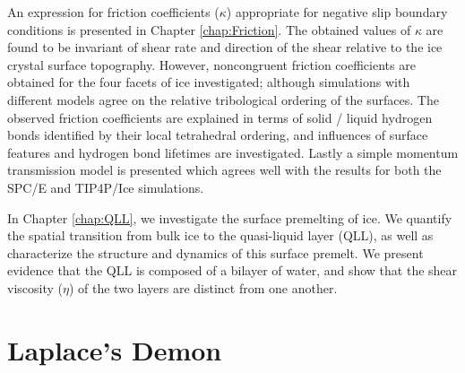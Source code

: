 An expression for friction coefficients ($\kappa$) appropriate for
negative slip boundary conditions is presented in Chapter
\ref{chap:Friction}. The obtained values of $\kappa$ are found to be
invariant of shear rate and direction of the shear relative to the ice
crystal surface topography. However, noncongruent friction
coefficients are obtained for the four facets of ice investigated;
although simulations with different models agree on the relative
tribological ordering of the surfaces. The observed friction
coefficients are explained in terms of solid / liquid hydrogen bonds
identified by their local tetrahedral ordering, and influences of
surface features and hydrogen bond lifetimes are investigated. Lastly
a simple momentum transmission model is presented which agrees well
with the results for both the SPC/E and TIP4P/Ice simulations.

In Chapter \ref{chap:QLL}, we investigate the surface premelting of
ice. We quantify the spatial transition from bulk ice to the
quasi-liquid layer (QLL), as well as characterize the structure and
dynamics of this surface premelt. We present evidence
that the QLL is composed of a bilayer of water, and show that the
shear viscosity ($\eta$) of the two layers are distinct from one
another.

\section{Laplace's Demon}





